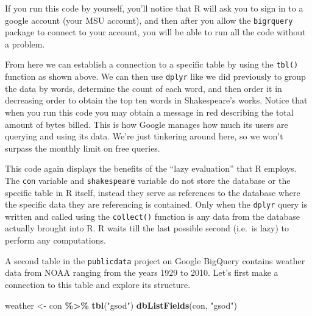 \documentclass[
]{krantz}
\makeatletter
\newenvironment{Shaded}{\begin{snugshade}}{\end{snugshade}}
\newcommand{\KeywordTok}[1]{\textcolor[rgb]{0.27,0.27,0.27}{\textbf{#1}}}
\newcommand{\NormalTok}[1]{#1}
\newcommand{\OperatorTok}[1]{\textcolor[rgb]{0.43,0.43,0.43}{\textbf{#1}}}
\newcommand{\StringTok}[1]{\textcolor[rgb]{0.5,0.5,0.5}{#1}}
\newenvironment{kframe}{%
\medskip{}
\setlength{\fboxsep}{.8em}
 \def\at@end@of@kframe{}%
 \ifinner\ifhmode%
  \def\at@end@of@kframe{\end{minipage}}%
  \begin{minipage}{\columnwidth}%
 \fi\fi%
 \def\FrameCommand##1{\hskip\@totalleftmargin \hskip-\fboxsep
 \colorbox{shadecolor}{##1}\hskip-\fboxsep
     \hskip-\linewidth \hskip-\@totalleftmargin \hskip\columnwidth}%
 \MakeFramed {\advance\hsize-\width
   \@totalleftmargin\z@ \linewidth\hsize
   \@setminipage}}%
 {\par\unskip\endMakeFramed%
 \at@end@of@kframe}
\renewenvironment{Shaded}{\begin{kframe}}{\end{kframe}}
\makeatother
\begin{document}
If you run this code by yourself, you'll notice that R will ask you to sign in to a google account (your MSU account), and then after you allow the \texttt{bigrquery} package to connect to your account, you will be able to run all the code without a problem.

From here we can establish a connection to a specific table by using the \texttt{tbl()} function as shown above. We can then use \texttt{dplyr} like we did previously to group the data by words, determine the count of each word, and then order it in decreasing order to obtain the top ten words in Shakespeare's works. Notice that when you run this code you may obtain a message in red describing the total amount of bytes billed. This is how Google manages how much its users are querying and using its data. We're just tinkering around here, so we won't surpass the monthly limit on free queries.

This code again displays the benefits of the ``lazy evaluation'' that R employs. The \texttt{con} variable and \texttt{shakespeare} variable do not store the database or the specific table in R itself, instead they serve as references to the database where the specific data they are referencing is contained. Only when the \texttt{dplyr} query is written and called using the \texttt{collect()} function is any data from the database actually brought into R. R waits till the last possible second (i.e.~is lazy) to perform any computations.

A second table in the \texttt{publicdata} project on Google BigQuery contains weather data from NOAA ranging from the years 1929 to 2010. Let's first make a connection to this table and explore its structure.

\begin{Shaded}
\begin{Highlighting}[]
\NormalTok{weather \textless{}{-}}\StringTok{ }\NormalTok{con }\OperatorTok{\%\textgreater{}\%}
\StringTok{  }\KeywordTok{tbl}\NormalTok{(}\StringTok{"gsod"}\NormalTok{)}
\KeywordTok{dbListFields}\NormalTok{(con, }\StringTok{"gsod"}\NormalTok{)}
\end{Highlighting}
\end{Shaded}
\end{document}
